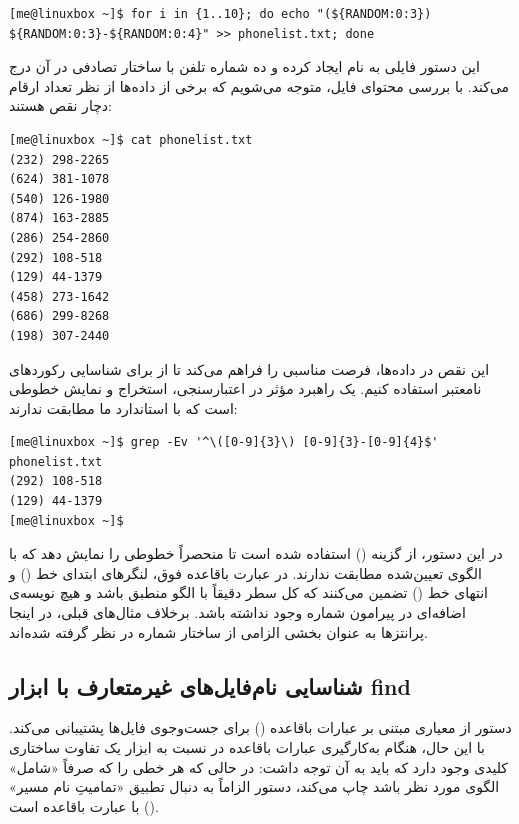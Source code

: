 \begin{latin}
\begin{lstlisting}
[me@linuxbox ~]$ for i in {1..10}; do echo "(${RANDOM:0:3}) ${RANDOM:0:3}-${RANDOM:0:4}" >> phonelist.txt; done
\end{lstlisting}
\end{latin}

این دستور فایلی به نام  ایجاد کرده و ده شماره تلفن با ساختار تصادفی در آن درج می‌کند. با بررسی محتوای فایل، متوجه می‌شویم که برخی از داده‌ها از نظر تعداد ارقام دچار نقص هستند:

\begin{latin}
\begin{lstlisting}
[me@linuxbox ~]$ cat phonelist.txt
(232) 298-2265
(624) 381-1078
(540) 126-1980
(874) 163-2885
(286) 254-2860
(292) 108-518
(129) 44-1379
(458) 273-1642
(686) 299-8268
(198) 307-2440
\end{lstlisting}
\end{latin}

این نقص در داده‌ها، فرصت مناسبی را فراهم می‌کند تا از  برای شناسایی رکوردهای نامعتبر استفاده کنیم. یک راهبرد مؤثر در اعتبارسنجی، استخراج و نمایش خطوطی است که با استاندارد ما مطابقت ندارند:

\begin{latin}
\begin{lstlisting}
[me@linuxbox ~]$ grep -Ev '^\([0-9]{3}\) [0-9]{3}-[0-9]{4}$'
phonelist.txt
(292) 108-518
(129) 44-1379
[me@linuxbox ~]$
\end{lstlisting}
\end{latin}

در این دستور، از گزینه  () استفاده شده است تا  منحصراً خطوطی را نمایش دهد که با الگوی تعیین‌شده مطابقت ندارند. در عبارت باقاعده فوق، لنگرهای ابتدای خط (\cmd{\^{}}) و انتهای خط (\cmd{\$}) تضمین می‌کنند که کل سطر دقیقاً با الگو منطبق باشد و هیچ نویسه‌ی اضافه‌ای در پیرامون شماره وجود نداشته باشد. برخلاف مثال‌های قبلی، در اینجا پرانتزها به عنوان بخشی الزامی از ساختار شماره در نظر گرفته شده‌اند.

\subsection{شناسایی نام‌فایل‌های غیرمتعارف با ابزار find}

دستور  از معیاری مبتنی بر عبارات باقاعده () برای جست‌وجوی فایل‌ها پشتیبانی می‌کند. با این حال، هنگام به‌کارگیری عبارات باقاعده در  نسبت به ابزار  یک تفاوت ساختاری کلیدی وجود دارد که باید به آن توجه داشت: در حالی که  هر خطی را که صرفاً «شامل» الگوی مورد نظر باشد چاپ می‌کند، دستور  الزاماً به دنبال تطبیق «تمامیتِ نام مسیر» () با عبارت باقاعده است.

